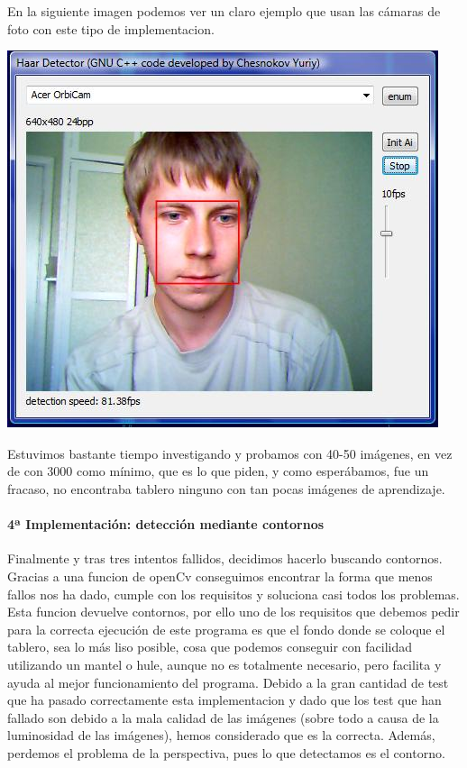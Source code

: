 \documentclass[12pt,a4paper]{report}
\begin{document}
En la siguiente imagen podemos ver un claro ejemplo que usan las cámaras de foto
con este tipo de implementacion.

\includegraphics[scale=1]{haartraining.jpg} 

Estuvimos bastante tiempo investigando y probamos con 40-50 imágenes, en vez de
con 3000 como mínimo, que es lo que piden, y como esperábamos, fue un fracaso,
no encontraba tablero ninguno con tan pocas imágenes de aprendizaje. 

\paragraph{4ª Implementación: detección mediante contornos}

Finalmente y tras tres intentos fallidos, decidimos hacerlo buscando contornos.
Gracias a una funcion de openCv conseguimos encontrar la forma que menos fallos
nos ha dado, cumple con los requisitos y soluciona casi todos los problemas.
Esta funcion devuelve contornos, por ello uno de los requisitos que debemos
pedir para la correcta ejecución de este programa es que el fondo donde se
coloque el tablero, sea lo más liso posible, cosa que podemos conseguir con
facilidad utilizando un mantel o hule, aunque no es totalmente necesario, pero
facilita y ayuda al mejor funcionamiento del programa. Debido a la gran cantidad
de test que ha pasado correctamente esta implementacion y dado que los test que
han fallado son debido a la mala calidad de las imágenes (sobre todo a causa de
la luminosidad de las imágenes), hemos considerado que es la correcta. Además,
perdemos el problema de la perspectiva, pues lo que detectamos es el contorno.
\end{document}
